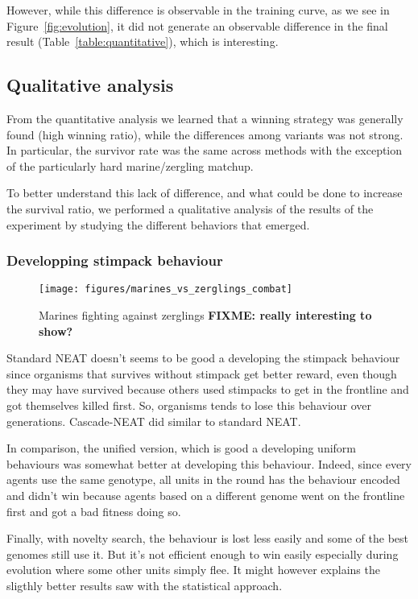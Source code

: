 However, while this difference is observable in the training curve, as
we see in Figure~\ref{fig:evolution}, it did not generate an
observable difference in the final result
(Table~\ref{table:quantitative}), which is interesting.

\subsection{Qualitative analysis}

From the quantitative analysis we learned that a winning strategy was
generally found (high winning ratio), while the differences among
variants was not strong. In particular, the survivor rate was the same
across methods with the exception of the particularly hard
marine/zergling matchup.

To better understand this lack of difference, and what could be done
to increase the survival ratio, we performed a qualitative analysis of the
results of the experiment by studying the different behaviors that emerged.

\subsubsection{Developping stimpack behaviour}

\begin{figure}
    \texttt{[image: figures/marines\_vs\_zerglings\_combat]}
    \caption{Marines fighting against zerglings {\bf FIXME: really interesting to show?}}\label{fig:marines_vs_zerglings}
\end{figure}

Standard NEAT doesn’t seems to be good a developing the stimpack behaviour since organisms
that survives without stimpack get better reward,
even though they may have survived because others used stimpacks to get in the frontline
and got themselves killed first.
So, organisms tends to lose this behaviour over generations.
Cascade-NEAT did similar to standard NEAT.

In comparison, the unified version, which is good a developing uniform behaviours
was somewhat better at developing this behaviour.
Indeed, since every agents use the same genotype, all units in the round
has the behaviour encoded and didn't win because agents based on a different genome
went on the frontline first and got a bad fitness doing so.

Finally, with novelty search, the behaviour is lost less easily and some of the best genomes still use it.
But it's not efficient enough to win easily especially during evolution where some other units
simply flee. It might however explains the sligthly better results saw with the statistical approach.


